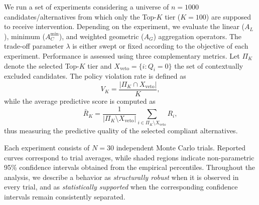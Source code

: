 \documentclass[mathematics,article,submit,moreauthors]{Definitions/mdpi}
\begin{document}
We run a set of experiments considering a universe of $n=1000$ candidates/alternatives from which only the Top-$K$ tier ($K=100$) are supposed to receive intervention. Depending on the experiment, we evaluate the linear ($A_L$), minimum ($A_C^{\min}$), and weighted geometric ($A_G$) aggregation operators. The trade-off parameter $\lambda$ is either swept or fixed according to the objective of each experiment. Performance is assessed using three complementary metrics. Let $\Pi_K$ denote the selected Top-$K$ tier and $X_{\mathrm{veto}}=\{i:Q_i=0\}$ the set of contextually excluded candidates. The policy violation rate is defined as
\[
V_K=\frac{|\Pi_K\cap X_{\mathrm{veto}}|}{K},
\]
while the average predictive score is computed as
\[
\bar{R}_K=\frac{1}{|\Pi_K\setminus X_{\mathrm{veto}}|}
\sum_{i\in \Pi_K\setminus X_{\mathrm{veto}}}R_i,
\]
thus measuring the predictive quality of the selected compliant alternatives. 

Each experiment consists of $N=30$ independent Monte Carlo trials. Reported curves correspond to trial averages, while shaded regions indicate non-parametric 95\% confidence intervals obtained from the empirical percentiles. Throughout the analysis, we describe a behavior as \emph{structurally robust} when it is observed in every trial, and as \emph{statistically supported} when the corresponding confidence intervals remain consistently separated.
\end{document}
